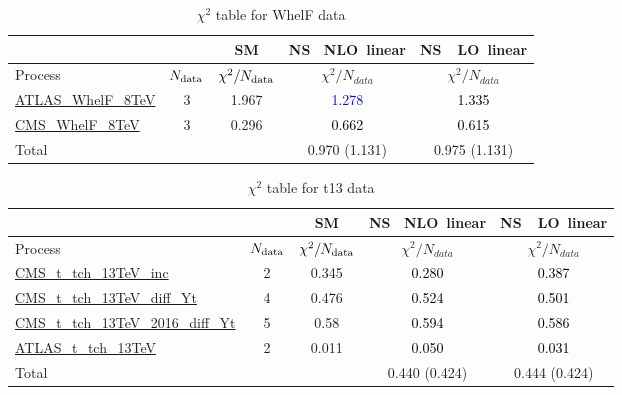 \documentclass{article}
\begin{document}
\begin{table}[H]
\centering
\begin{tabular}{|l|c|c|c|c|}
\hline
 \multicolumn{2}{|c|}{} & SM& \rm NS \ NLO\ linear& \rm NS\ \ LO\ linear\\ \hline
Process & $N_{\rm data}$ & $\chi^ 2/N_{\rm data}$& $\chi^ 2/N_{data}$& $\chi^ 2/N_{data}$\\ \hline
\href{https://arxiv.org/abs/1612.02577}{ATLAS_WhelF_8TeV} & 3 & 1.967 & \textcolor{blue}                            {1.278} & \textcolor{black}                            {1.335} \\ \hline
\href{https://arxiv.org/abs/1605.09047}{CMS_WhelF_8TeV} & 3 & 0.296 & \textcolor{black}                            {0.662} & \textcolor{black}                            {0.615} \\ \hline
\hline Total & &  & 0.970 (1.131) & 0.975 (1.131) \\ \hline
\end{tabular}
\caption{$\chi^2$ table for WhelF data}
\end{table}
\begin{table}[H]
\centering
\begin{tabular}{|l|c|c|c|c|}
\hline
 \multicolumn{2}{|c|}{} & SM& \rm NS \ NLO\ linear& \rm NS\ \ LO\ linear\\ \hline
Process & $N_{\rm data}$ & $\chi^ 2/N_{\rm data}$& $\chi^ 2/N_{data}$& $\chi^ 2/N_{data}$\\ \hline
\href{https://arxiv.org/abs/1610.00678}{CMS_t_tch_13TeV_inc} & 2 & 0.345 & \textcolor{black}                            {0.280} & \textcolor{black}                            {0.387} \\ \hline
\href{https://cds.cern.ch/record/2151074}{CMS_t_tch_13TeV_diff_Yt} & 4 & 0.476 & \textcolor{black}                            {0.524} & \textcolor{black}                            {0.501} \\ \hline
\href{https://arxiv.org/abs/1907.08330}{CMS_t_tch_13TeV_2016_diff_Yt} & 5 & 0.58 & \textcolor{black}                            {0.594} & \textcolor{black}                            {0.586} \\ \hline
\href{https://arxiv.org/abs/1609.03920}{ATLAS_t_tch_13TeV} & 2 & 0.011 & \textcolor{black}                            {0.050} & \textcolor{black}                            {0.031} \\ \hline
\hline Total & &  & 0.440 (0.424) & 0.444 (0.424) \\ \hline
\end{tabular}
\caption{$\chi^2$ table for t13 data}
\end{table}
\end{document}
